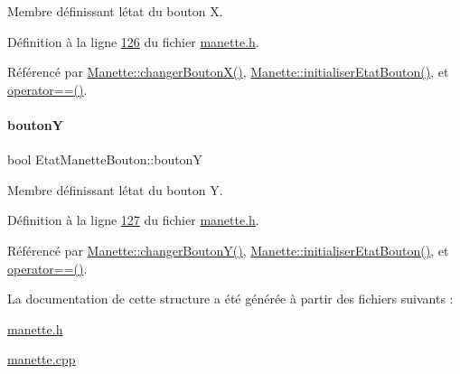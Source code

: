 Membre définissant l\textquotesingle{}état du bouton X. 



Définition à la ligne \hyperlink{manette_8h_source_l00126}{126} du fichier \hyperlink{manette_8h_source}{manette.\+h}.



Référencé par \hyperlink{manette_8cpp_source_l00565}{Manette\+::changer\+Bouton\+X()}, \hyperlink{manette_8cpp_source_l00313}{Manette\+::initialiser\+Etat\+Bouton()}, et \hyperlink{manette_8cpp_source_l00594}{operator==()}.

\mbox{\label{struct_etat_manette_bouton_aae061f9e32f970787226ef9e0bdb5a17}} 
\paragraph{\texorpdfstring{boutonY}{boutonY}}
{\footnotesize\ttfamily bool Etat\+Manette\+Bouton\+::boutonY}



Membre définissant l\textquotesingle{}état du bouton Y. 



Définition à la ligne \hyperlink{manette_8h_source_l00127}{127} du fichier \hyperlink{manette_8h_source}{manette.\+h}.



Référencé par \hyperlink{manette_8cpp_source_l00572}{Manette\+::changer\+Bouton\+Y()}, \hyperlink{manette_8cpp_source_l00313}{Manette\+::initialiser\+Etat\+Bouton()}, et \hyperlink{manette_8cpp_source_l00594}{operator==()}.



La documentation de cette structure a été générée à partir des fichiers suivants \+:\begin{DoxyCompactItemize}
\item 
\hyperlink{manette_8h}{manette.\+h}\item 
\hyperlink{manette_8cpp}{manette.\+cpp}\end{DoxyCompactItemize}
